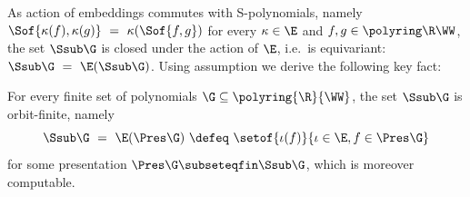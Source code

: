 As action of embeddings commutes with S-polynomials, namely 
$\Sof {\kappa(f), \kappa(g)} \ = \ \kappa(\Sof {f,g})$
for every $\kappa\in\E$ and $f,g\in\polyring \R \WW$,
the set $\Ssub \G$ is closed under the action of $\E$, i.e.~is equivariant:
$\Ssub\G \ = \ \E(\Ssub\G)$.
Using assumption  we derive the following key fact:
%
%
\begin{lemma} \label{lem:min finite}
For every finite set of polynomials $\G \subseteq \polyring{\R}{\WW}$, the set $\Ssub\G$ 
is orbit-finite, namely
\[
\Ssub\G \ = \ \E(\Pres\G) \ \defeq \ \setof{\iota(f)}{\iota\in\E, f\in\Pres\G}
\]
for some presentation $\Pres\G \subseteqfin \Ssub\G$, which is moreover computable.
\end{lemma}
%

